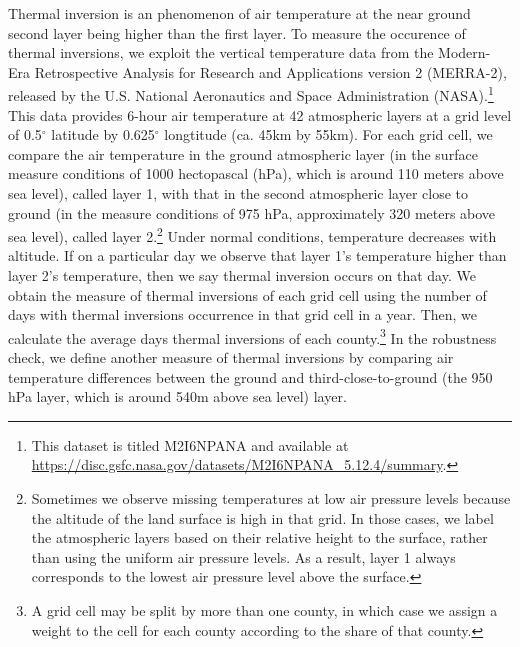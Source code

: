 \documentclass[12pt]{article}
\begin{document}
\label{sec:data_TI} Thermal inversion is an phenomenon of air temperature at
the near ground second layer being higher than the first layer. To measure
the occurence of thermal inversions, we exploit the vertical temperature
data from the Modern-Era Retrospective Analysis for Research and
Applications version 2 (MERRA-2), released by the U.S. National Aeronautics and Space Administration (NASA).\footnote{This dataset is titled M2I6NPANA and available at \url{https://disc.gsfc.nasa.gov/datasets/M2I6NPANA_5.12.4/summary}.} This
data provides 6-hour air temperature at 42 atmospheric layers at a grid
level of 0.5${{}^\circ}$ latitude
by 0.625${{}^\circ}$ longtitude
(ca. 45km by 55km). For each grid cell, we compare
the air temperature in the ground atmospheric layer (in the surface measure
conditions of 1000 hectopascal (hPa), which is around 110
meters above sea level), called layer 1, with that in the second atmospheric
layer close to ground (in the measure conditions of 975 hPa, approximately
320 meters above sea level), called layer 2.\footnote{%
Sometimes we observe missing temperatures at low air pressure levels because
the altitude of the land surface is high in that grid. In those cases, we
label the atmospheric layers based on their relative height to the surface,
rather than using the uniform air pressure levels. As a result, layer 1
always corresponds to the lowest air pressure level above the surface.}
Under normal conditions, temperature decreases with altitude. If on a
particular day we observe that layer 1's temperature higher than layer 2's
temperature, then we say thermal inversion occurs on that day. We obtain
the measure of thermal inversions of each grid cell using the number of days
with thermal inversions occurrence in that grid cell in a year. Then, we calculate the average days thermal inversions of each county.\footnote{A grid cell may be split by more than one county, in which case we assign a weight to the cell for each county according to the share of that county.} In the robustness check, we define another
measure of thermal inversions by comparing air temperature differences
between the ground and third-close-to-ground (the 950 hPa layer, which is
around 540m above sea level) layer.
\end{document}
